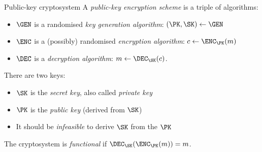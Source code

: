 \begin{frame}{Public-key cryptosystem}
  A \emph{public-key encryption scheme} is a triple of algorithms:
  \begin{itemize}[<+(1)->]
    \item $\GEN$ is a randomised \emph{key generation algorithm}: $(\PK,\SK)\gets\GEN$
    \item $\ENC$ is a (possibly) randomised \emph{encryption algorithm}: $c\gets\ENC_\PK(m)$
    \item $\DEC$ is a \emph{decryption algorithm}: $m\gets\DEC_\SK(c)$.
  \end{itemize}

  \pause
  There are two keys:
  \begin{itemize}[<+(1)->]
    \item $\SK$ is the \emph{secret key}, also called \emph{private key}
    \item $\PK$ is the \emph{public key} (derived from $\SK$)
    \item It should be \emph{infeasible} to derive $\SK$ from the $\PK$
  \end{itemize}

  \pause
  The cryptosystem is \emph{functional} if $\DEC_\SK(\ENC_\PK(m))=m$.
\end{frame}

